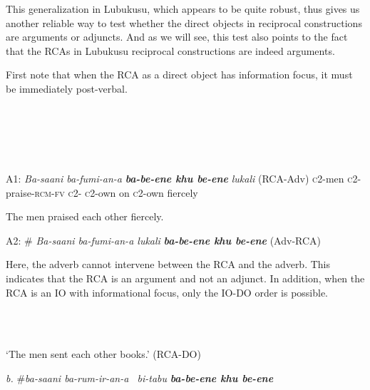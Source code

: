   This generalization in Lubukusu, which appears to be quite robust, thus gives us another reliable way to test whether the direct objects in reciprocal constructions are arguments or adjuncts. And as we will see, this test also points to the fact that the RCAs in Lubukusu reciprocal constructions are indeed  arguments.

First note that when the RCA as a direct object has information focus, it must be immediately post-verbal. 

\begin{listWWviiiNumxlileveli}
\item \ea\label{ex:}
\\
\ea\label{ex:}
\\
\ea\label{ex:}
\\
\ea\label{ex:}
\\
\end{listWWviiiNumxlileveli}

  A1:   \textit{Ba-saani ba-fumi-an-a      }\textbf{\textit{ba-be-ene    khu be-ene}}\textit{   lukali }   (RCA-Adv)      \textsc{c}2-men   \textsc{c}2-praise-\textsc{rcm-fv}       \textsc{c}2-\textsc{ c}2-own  on   \textsc{c}2-own  fiercely

    The men praised each other fiercely.

  A2:   \#\textit{ Ba-saani ba-fumi-an-a   lukali}\textbf{\textit{       ba-be-ene khu be-ene}}\textit{     }    (Adv-RCA)  

Here, the adverb cannot intervene between the RCA and the adverb. This indicates that the RCA is an argument and not an adjunct. In addition, when the RCA is an IO with informational focus, only the IO-DO order is possible.

\begin{listWWviiiNumxlileveli}
\item \ea\label{ex:}
\\
\ea\label{ex:}
\\
\end{listWWviiiNumxlileveli}
\setcounter{listWWviiiNumxixleveli}{0}
\begin{listWWviiiNumxixleveli}
\begin{styleExample}
    ‘The men sent each other books.’          (RCA-DO)
\end{styleExample}

\begin{styleExample}
  \textit{b.}  \#\textit{ba-saani   ba-rum-ir-an-a~  bi-tabu   }\textbf{\textit{ba-be-ene khu be-ene}} 
\end{styleExample}
\end{listWWviiiNumxixleveli}


